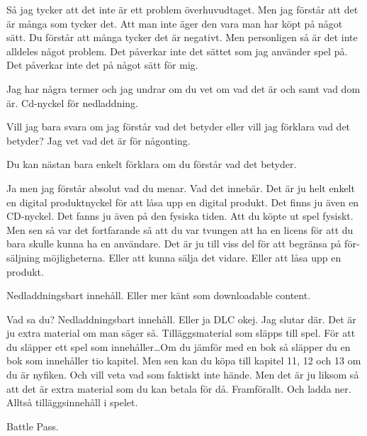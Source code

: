 \documentclass[11p]{article}
\begin{document}
\begin{otherlanguage}{swedish}
        Så jag tycker att det inte är ett problem överhuvudtaget. Men jag förstår att det är många som tycker det.
        Att man inte äger den vara man har köpt på något sätt. Du förstår att många tycker det är negativt. Men personligen så är det inte alldeles något problem.
        Det påverkar inte det sättet som jag använder spel på. Det påverkar inte det på något sätt för mig.


        \setlength{\leftskip}{0cm}
        Jag har några termer och jag undrar om du vet om vad det är och samt vad dom är.
        Cd-nyckel för nedladdning.


        \setlength{\leftskip}{1cm}

        Vill jag bara svara om jag förstår vad det betyder eller vill jag förklara vad det betyder? Jag vet vad det är för någonting.

        \setlength{\leftskip}{0cm}
        Du kan nästan bara enkelt förklara om du förstår vad det betyder.

        \setlength{\leftskip}{1cm}

        Ja men jag förstår absolut vad du menar. Vad det innebär.
        Det är ju helt enkelt en digital produktnyckel för att låsa upp en digital produkt. Det finns ju även en CD-nyckel. Det fanns ju även på den fysiska tiden. Att du köpte ut spel fysiskt.
        Men sen så var det fortfarande så att du var tvungen att ha en licens för att du bara skulle kunna ha en användare. Det är ju till viss del för att begränsa på försäljning möjligheterna. Eller att kunna sälja det vidare. Eller att låsa upp en produkt.


        \setlength{\leftskip}{0cm}
        Nedladdningsbart innehåll. Eller mer känt som downloadable content.

        \setlength{\leftskip}{1cm}

        Vad sa du? Nedladdningsbart innehåll. Eller ja DLC okej. Jag slutar där. Det är ju extra material om man säger så.
        Tilläggsmaterial som släpps till spel. För att du släpper ett spel som innehåller\dots Om du jämför med en bok så släpper du en bok som innehåller tio kapitel.
        Men sen kan du köpa till kapitel 11, 12 och 13 om du är nyfiken. Och vill veta vad som faktiskt inte hände. Men det är ju liksom så att det är extra material som du kan betala för då. Framförallt. Och ladda ner. Alltså tilläggsinnehåll i spelet.


        \setlength{\leftskip}{0cm}
        Battle Pass.

        \setlength{\leftskip}{1cm}


\end{otherlanguage}
\end{document}
